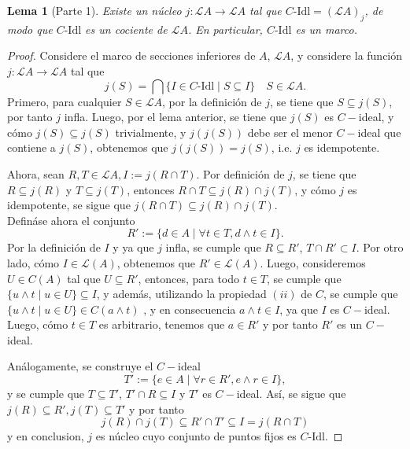 \documentclass[12pt,letterpaper,titlepage]{article}
\newtheorem{lemma}{Lema}
\theoremstyle{definition}
\renewcommand\cal[1]{\mathcal{#1}}
\newcommand\<{\langle}
\renewcommand\>{\rangle}
\newcommand\Idl{\text{-}\mathrm{Idl}}
\begin{document}
\begin{lemma}[Parte 1]
    Existe un núcleo $j:\cal LA\to\cal LA$ tal que
    $C\Idl=(\cal LA)_j$, de modo que $C\Idl$ es un cociente
    de $\cal LA$.
    En particular, $C\Idl$ es un marco.
\end{lemma}
\begin{proof}
    Considere el marco de secciones inferiores de $A$, $\mathcal{L}A$, y considere la función $j:\mathcal{L}A\to\mathcal{L}A$ tal que
    \begin{equation*}
        j(S)=\bigcap\{I\in C\Idl\mid S\subseteq I\}\quad S\in\mathcal{L}A.
    \end{equation*}
    Primero, para cualquier $S\in\mathcal{L}A$, por la definición de $j$, se tiene que $S\subseteq j(S)$, por tanto $j$ infla. Luego, por el lema anterior, se tiene que $j(S)$ es $C-$ideal, y cómo $j(S)\subseteq j(S)$ trivialmente, y $j(j(S))$ debe ser el menor $C-$ideal que contiene a $j(S)$, obtenemos que $j(j(S))=j(S)$, i.e. $j$ es idempotente.
    
    Ahora, sean $R,T\in\mathcal{L}A, I:=j(R\cap T)$. Por definición de $j$, se tiene que $R\subseteq j(R)$ y $T\subseteq j(T)$, entonces $R\cap T\subseteq j(R)\cap j(T)$, y cómo $j$ es idempotente, se sigue que $j(R\cap T)\subseteq j(R)\cap j(T)$.\\
    Defináse ahora el conjunto
    \begin{equation*}
        R' := \{d\in A\mid \forall t\in T,d\wedge t\in I\}.
    \end{equation*}
    Por la definición de $I$ y ya que $j$ infla, se cumple que $R\subseteq R'$, $T\cap R'\subset I$. Por otro lado, cómo $I\in\mathcal{L}(A)$, obtenemos que $R'\in\mathcal{L}(A)$. Luego, consideremos $U\in C(A)$ tal que $U\subseteq R'$, entonces, para todo $t\in T$, se cumple que $\{u\wedge t\mid u\in U\}\subseteq I$, y además, utilizando la propiedad $(ii)$ de $C$, se cumple que $\{u\wedge t\mid u\in U\}\in C(a\wedge t)$ , y en consecuencia $a\wedge t\in I$, ya que $I$ es $C-$ideal. Luego, cómo $t\in T$ es arbitrario, tenemos que $a\in R'$ y por tanto $R'$ es un $C-$ideal.
    
    Análogamente, se construye el $C-$ideal
    \begin{equation*}
         T' := \{e\in A\mid \forall r\in R',e\wedge r\in I\},
    \end{equation*}
    y se cumple que $T\subseteq T'$, $T'\cap R\subseteq I$ y $T'$ es $C-$ideal. Así, se sigue que $j(R)\subseteq R',j(T)\subseteq T'$ y por tanto
    \begin{equation*}
        j(R)\cap j(T)\subseteq R'\cap T' \subseteq  I = j(R\cap T)
    \end{equation*}
    y en conclusion, $j$ es núcleo cuyo conjunto de puntos fijos
    es $C\Idl$.
\end{proof}
\end{document}
